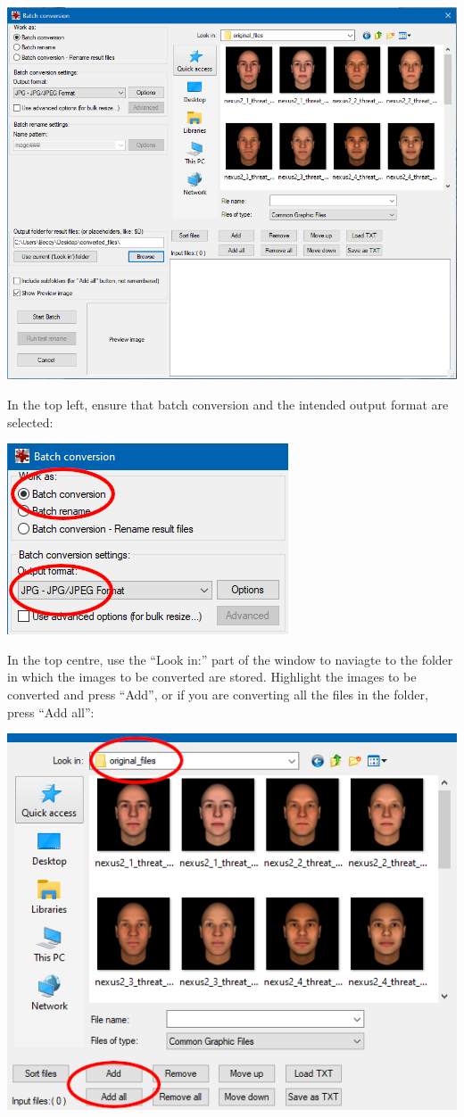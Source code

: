 \documentclass[]{book}
\begin{document}
\includegraphics{images/screenshots/irfanview_3.png}

In the top left, ensure that batch conversion and the intended output
format are selected:

\includegraphics{images/screenshots/irfanview_4.png}

In the top centre, use the ``Look in:'' part of the window to naviagte
to the folder in which the images to be converted are stored. Highlight
the images to be converted and press ``Add'', or if you are converting
all the files in the folder, press ``Add all'':

\includegraphics{images/screenshots/irfanview_5.png}
\end{document}
